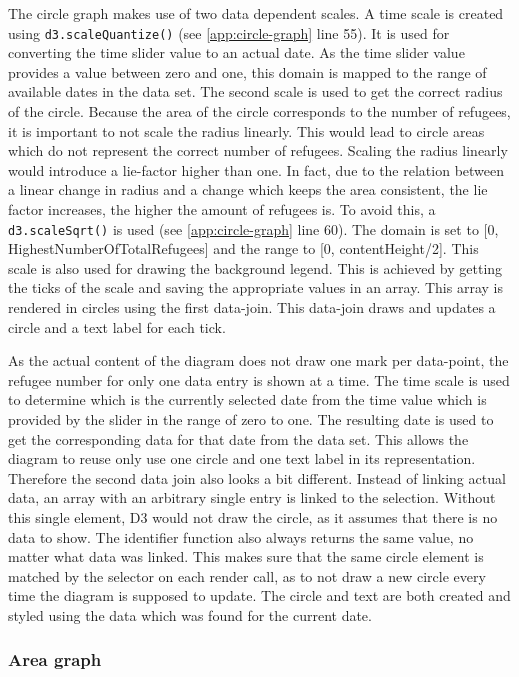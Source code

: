 The circle graph makes use of two data dependent scales. A time scale is created using \texttt{d3.scaleQuantize()} (see \ref{app:circle-graph} line 55). It is used for converting the time slider value to an actual date. As the time slider value provides a value between zero and one, this domain is mapped to the range of available dates in the data set. The second scale is used to get the correct radius of the circle. Because the area of the circle corresponds to the number of refugees, it is important to not scale the radius linearly. This would lead to circle areas which do not represent the correct number of refugees. Scaling the radius linearly would introduce a lie-factor higher than one. In fact, due to the relation between a linear change in radius and a change which keeps the area consistent, the lie factor increases, the higher the amount of refugees is. To avoid this, a \texttt{d3.scaleSqrt()} is used (see \ref{app:circle-graph} line 60). The domain is set to [0, HighestNumberOfTotalRefugees] and the range to [0, contentHeight/2]. This scale is also used for drawing the background legend. This is achieved by getting the ticks of the scale and saving the appropriate values in an array. This array is rendered in circles using the first data-join. This data-join draws and updates a circle and a text label for each tick.

As the actual content of the diagram does not draw one mark per data-point, the refugee number for only one data entry is shown at a time. The time scale is used to determine which is the currently selected date from the time value which is provided by the slider in the range of zero to one. The resulting date is used to get the corresponding data for that date from the data set. This allows the diagram to reuse only use one circle and one text label in its representation. Therefore the second data join also looks a bit different. Instead of linking actual data, an array with an arbitrary single entry is linked to the selection. Without this single element, D3 would not draw the circle, as it assumes that there is no data to show. The identifier function also always returns the same value, no matter what data was linked. This makes sure that the same circle element is matched by the selector on each render call, as to not draw a new circle every time the diagram is supposed to update. The circle and text are both created and styled using the data which was found for the current date.

\subsubsection{Area graph}

